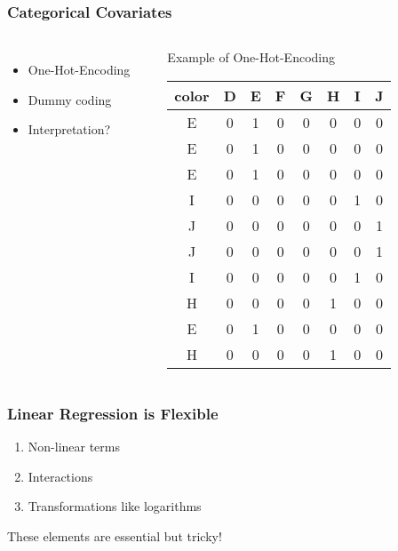 \documentclass[
    utf8,
    aspectratio=169
]{beamer}  %
\begin{document}
\begin{frame}
	\frametitle{Categorical Covariates}
	\begin{columns}[onlytextwidth]
		\begin{itemize}
			\item One-Hot-Encoding
			\item Dummy coding
			\item Interpretation?
		\end{itemize}
	
		\vspace{1cm}
	
		\begin{example}
		\end{example}
	
		\begin{block}{\centering Example of One-Hot-Encoding}
			\begin{small}
				\begin{table}
					\begin{tabular}{c|ccccccc}
						   color& D& E& F &G&H &I &J \\
				  		\hline
						E  &   0  &   1  &   0  &   0  &   0  &   0  &   0 \\
						E  &   0  &   1  &   0  &   0  &   0  &   0  &   0 \\
						E  &   0  &   1  &   0  &   0  &   0  &   0  &   0 \\
						I  &   0  &   0  &   0  &   0  &   0  &   1  &   0 \\
						J  &   0  &   0  &   0  &   0  &   0  &   0  &   1 \\
						J  &   0  &   0  &   0  &   0  &   0  &   0  &   1 \\
						I  &   0  &   0  &   0  &   0  &   0  &   1  &   0 \\
						H  &   0  &   0  &   0  &   0  &   1  &   0  &   0 \\
						E  &   0  &   1  &   0  &   0  &   0  &   0  &   0 \\
						H  &   0  &   0  &   0  &   0  &   1  &   0  &   0 \\
				     	\hline
					\end{tabular}
				\end{table}
			\end{small}
		\end{block}
	\end{columns}
\end{frame}

\begin{frame}
	\frametitle{Linear Regression is Flexible}
	\begin{enumerate}
		\item Non-linear terms
		\item Interactions
		\item Transformations like logarithms
	\end{enumerate}
	
	\vfill
	
	\begin{alertblock}{These elements are essential but tricky!}
	\end{alertblock}
\end{frame}
\end{document}
